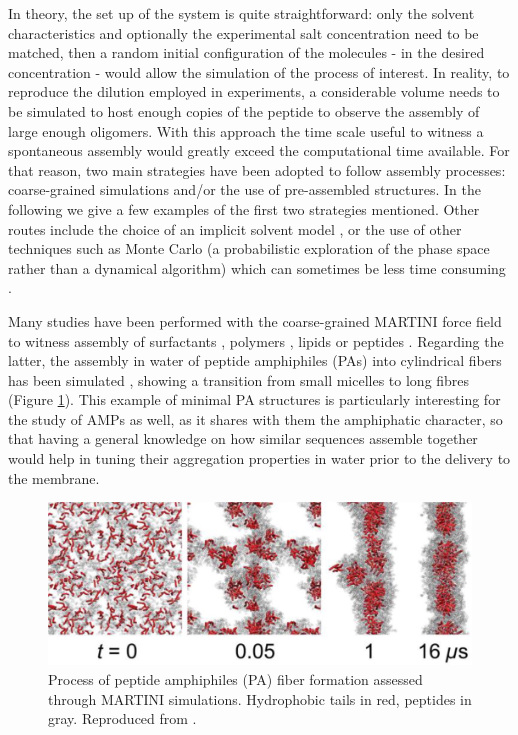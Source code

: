 In theory, the set up of the system is quite straightforward: only the solvent characteristics and optionally the experimental salt concentration need to be matched, then a random initial configuration of the molecules - in the desired concentration - would allow the simulation of the process of interest.
%
In reality, to reproduce the dilution employed in experiments, a considerable volume needs to be simulated to host enough copies of the peptide to observe the assembly of large enough oligomers.
%
With this approach the time scale useful to witness a spontaneous assembly would greatly exceed the computational time available. For that reason, two main strategies have been adopted to follow assembly processes: coarse-grained simulations and/or  the  use  of
pre-assembled structures. In the following we give a few examples of the first two strategies mentioned. Other routes include the choice of an implicit solvent model \citep{Jusufi2013,Spaeth2011}, or the use of other techniques such as Monte Carlo (a probabilistic exploration of the phase space rather than a dynamical algorithm) which can sometimes be less time consuming \citep{He2001,Majumdar2019,Luo2015}. 

Many studies have been performed with the coarse-grained MARTINI force field to witness assembly of surfactants \citep{Wu2012}, polymers \citep{Wang2012poly,Bochicchio2017}, lipids \citep{Lee2011,Brocos2012} or peptides \citep{Guo2012,Seo2012}.
%
Regarding the latter, the assembly in water of peptide amphiphiles (PAs) into cylindrical fibers has been simulated \citep{Lee2012}, showing a transition from small micelles to long fibres (Figure \ref{fig:PA}). This example of minimal PA structures is particularly interesting for the study of AMPs as well, as it shares with them the amphiphatic character, so that having a general knowledge on how similar sequences assemble together would help in tuning their aggregation properties in water prior to the delivery to the membrane.
%
\begin{figure}[t!]
\centering
\includegraphics[width=0.8\linewidth]{2methods/pics/PA.jpeg}
%
\caption[Peptide amphiphiles assembly through MARTINI simulations]{Process of peptide amphiphiles (PA) fiber formation assessed through MARTINI simulations. Hydrophobic tails in red, peptides in gray. Reproduced from \citet{Lee2012}.}
\label{fig:PA}
\end{figure}

